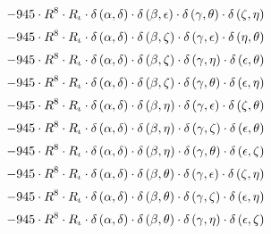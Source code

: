 \begin{subequations}
\begin{gather}
 \\[0.2em] \notag 		 - 945 \cdot R^{8} \cdot R_{\iota{}} \cdot \delta{}\left(\alpha{}, \delta{}\right) \cdot \delta{}\left(\beta{}, \epsilon{}\right) \cdot \delta{}\left(\gamma{}, \theta{}\right) \cdot \delta{}\left(\zeta{}, \eta{}\right) 
 \\[0.2em] \notag 		 - 945 \cdot R^{8} \cdot R_{\iota{}} \cdot \delta{}\left(\alpha{}, \delta{}\right) \cdot \delta{}\left(\beta{}, \zeta{}\right) \cdot \delta{}\left(\gamma{}, \epsilon{}\right) \cdot \delta{}\left(\eta{}, \theta{}\right) 
 \\[0.2em] \notag 		 - 945 \cdot R^{8} \cdot R_{\iota{}} \cdot \delta{}\left(\alpha{}, \delta{}\right) \cdot \delta{}\left(\beta{}, \zeta{}\right) \cdot \delta{}\left(\gamma{}, \eta{}\right) \cdot \delta{}\left(\epsilon{}, \theta{}\right) 
 \\[0.2em] \notag 		 - 945 \cdot R^{8} \cdot R_{\iota{}} \cdot \delta{}\left(\alpha{}, \delta{}\right) \cdot \delta{}\left(\beta{}, \zeta{}\right) \cdot \delta{}\left(\gamma{}, \theta{}\right) \cdot \delta{}\left(\epsilon{}, \eta{}\right) 
 \\[0.2em] \notag 		 - 945 \cdot R^{8} \cdot R_{\iota{}} \cdot \delta{}\left(\alpha{}, \delta{}\right) \cdot \delta{}\left(\beta{}, \eta{}\right) \cdot \delta{}\left(\gamma{}, \epsilon{}\right) \cdot \delta{}\left(\zeta{}, \theta{}\right) 
 \\[0.2em] \notag 		 - 945 \cdot R^{8} \cdot R_{\iota{}} \cdot \delta{}\left(\alpha{}, \delta{}\right) \cdot \delta{}\left(\beta{}, \eta{}\right) \cdot \delta{}\left(\gamma{}, \zeta{}\right) \cdot \delta{}\left(\epsilon{}, \theta{}\right) 
 \\[0.2em] \notag 		 - 945 \cdot R^{8} \cdot R_{\iota{}} \cdot \delta{}\left(\alpha{}, \delta{}\right) \cdot \delta{}\left(\beta{}, \eta{}\right) \cdot \delta{}\left(\gamma{}, \theta{}\right) \cdot \delta{}\left(\epsilon{}, \zeta{}\right) 
 \\[0.2em] \notag 		 - 945 \cdot R^{8} \cdot R_{\iota{}} \cdot \delta{}\left(\alpha{}, \delta{}\right) \cdot \delta{}\left(\beta{}, \theta{}\right) \cdot \delta{}\left(\gamma{}, \epsilon{}\right) \cdot \delta{}\left(\zeta{}, \eta{}\right) 
 \\[0.2em] \notag 		 - 945 \cdot R^{8} \cdot R_{\iota{}} \cdot \delta{}\left(\alpha{}, \delta{}\right) \cdot \delta{}\left(\beta{}, \theta{}\right) \cdot \delta{}\left(\gamma{}, \zeta{}\right) \cdot \delta{}\left(\epsilon{}, \eta{}\right) 
 \\[0.2em] \notag 		 - 945 \cdot R^{8} \cdot R_{\iota{}} \cdot \delta{}\left(\alpha{}, \delta{}\right) \cdot \delta{}\left(\beta{}, \theta{}\right) \cdot \delta{}\left(\gamma{}, \eta{}\right) \cdot \delta{}\left(\epsilon{}, \zeta{}\right) 

\end{gather}
\end{subequations}
